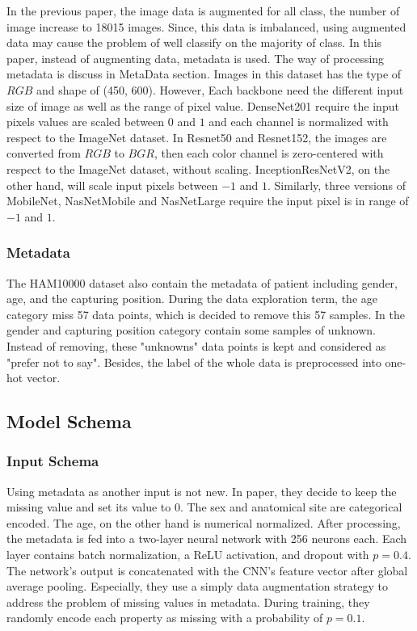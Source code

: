 \documentclass[sensors,article,submit,pdftex,moreauthors]{Definitions/mdpi}
\begin{document}
In the previous paper\cite{03358}, the image data is augmented for all class, the number of image increase to 18015 images. Since, this data is imbalanced, using augmented data may cause the problem of well classify on the majority of class. In this paper, instead of augmenting data, metadata is used. The way of processing metadata is discuss in MetaData section. Images in this dataset has the type of $RGB$ and shape of (450, 600). However, Each backbone need the different input size of image as well as the range of pixel value. DenseNet201\cite{06993} require the input pixels values are scaled between $0$ and $1$ and each channel is normalized with respect to the ImageNet dataset. In Resnet50 and Resnet152\cite{03385}\cite{05027}, the images are converted from $RGB$ to $BGR$, then each color channel is zero-centered with respect to the ImageNet dataset, without scaling. InceptionResNetV2\cite{11946}, on the other hand, will scale input pixels between $-1$ and $1$. Similarly, three versions of MobileNet\cite{04861}\cite{04381}\cite{02244}, NasNetMobile and NasNetLarge\cite{07012} require the input pixel is in range of $-1$ and $1$. 
\subsubsection{Metadata}
The HAM10000 dataset\cite{10417} also contain the metadata of patient including gender, age, and the capturing position. During the data exploration term, the age category miss 57 data points, which is decided to remove this 57 samples. In the gender and capturing position category contain some samples of unknown. Instead of removing, these "unknowns" data points is kept and considered as "prefer not to say". Besides, the label of the whole data is preprocessed into one-hot vector.
\subsection{Model Schema}
\subsubsection{Input Schema}
Using metadata as another input is not new. In paper\cite{03910}, they decide to keep the missing value and set its value to $0$. The sex and anatomical site are categorical encoded. The age, on the other hand is numerical normalized. After processing, the metadata is fed into a two-layer neural network with 256 neurons each. Each layer contains batch normalization, a ReLU\cite{08375} activation, and dropout with $p = 0.4$. The network’s output is concatenated with the CNN’s feature vector after global average pooling. Especially, they use a simply data augmentation strategy to address the problem of missing values in metadata. During training, they randomly encode each property as missing with a probability of $p = 0.1$. 
\end{document}
